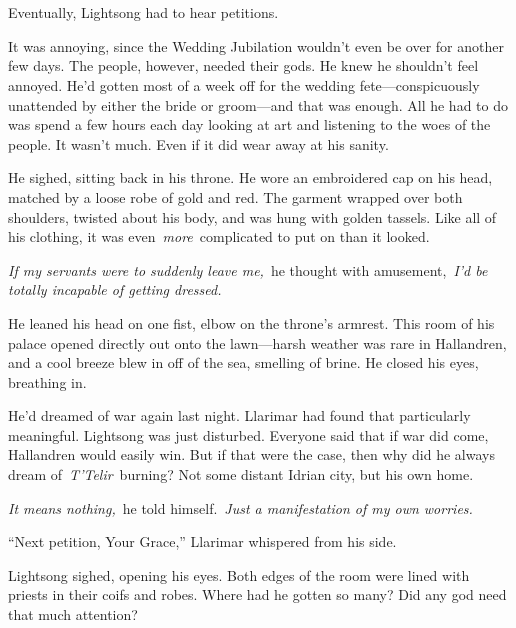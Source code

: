 \chapter{}

Eventually, Lightsong had to hear petitions.

It was annoying, since the Wedding Jubilation wouldn’t even be over for another few days. The people, however, needed their gods. He knew he shouldn’t feel annoyed. He’d gotten most of a week off for the wedding fete—conspicuously unattended by either the bride or groom—and that was enough. All he had to do was spend a few hours each day looking at art and listening to the woes of the people. It wasn’t much. Even if it did wear away at his sanity.

He sighed, sitting back in his throne. He wore an embroidered cap on his head, matched by a loose robe of gold and red. The garment wrapped over both shoulders, twisted about his body, and was hung with golden tassels. Like all of his clothing, it was even~\textit{more}~complicated to put on than it looked.

\textit{If my servants were to suddenly leave me,}~he thought with amusement,~\textit{I’d be totally incapable of getting dressed.}

He leaned his head on one fist, elbow on the throne’s armrest. This room of his palace opened directly out onto the lawn—harsh weather was rare in Hallandren, and a cool breeze blew in off of the sea, smelling of brine. He closed his eyes, breathing in.

He’d dreamed of war again last night. Llarimar had found that particularly meaningful. Lightsong was just disturbed. Everyone said that if war did come, Hallandren would easily win. But if that were the case, then why did he always dream of~\textit{T’Telir}~burning? Not some distant Idrian city, but his own home.

\textit{It means nothing,}~he told himself.~\textit{Just a manifestation of my own worries.}

“Next petition, Your Grace,” Llarimar whispered from his side.

Lightsong sighed, opening his eyes. Both edges of the room were lined with priests in their coifs and robes. Where had he gotten so many? Did any god need that much attention?

